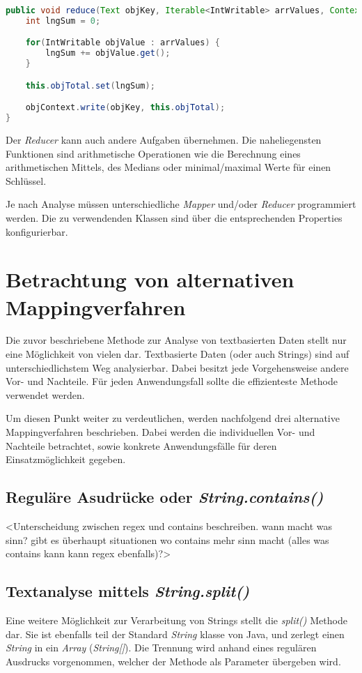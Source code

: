\begin{lstlisting}[language=Java,caption=Methode \textit{reduce()} der Klasse \textit{CountReducer},label=lst:MethodeReduce]
public void reduce(Text objKey, Iterable<IntWritable> arrValues, Context objContext) throws IOException, InterruptedException {
	int lngSum = 0;

	for(IntWritable objValue : arrValues) {
		lngSum += objValue.get();
	}

	this.objTotal.set(lngSum);

	objContext.write(objKey, this.objTotal);
}
\end{lstlisting}

Der \textit{Reducer} kann auch andere Aufgaben übernehmen. Die naheliegensten Funktionen sind arithmetische Operationen wie die Berechnung eines arithmetischen Mittels, des Medians oder minimal/maximal Werte für einen Schlüssel.

Je nach Analyse müssen unterschiedliche \textit{Mapper} und/oder \textit{Reducer} programmiert werden. Die zu verwendenden Klassen sind über die entsprechenden Properties konfigurierbar.

\section{Betrachtung von alternativen Mappingverfahren}
Die zuvor beschriebene Methode zur Analyse von textbasierten Daten stellt nur eine Möglichkeit von vielen dar. Textbasierte Daten (oder auch Strings) sind auf unterschiedlichstem Weg analysierbar. Dabei besitzt jede Vorgehensweise andere Vor- und Nachteile. Für jeden Anwendungsfall sollte die effizienteste Methode verwendet werden.

Um diesen Punkt weiter zu verdeutlichen, werden nachfolgend drei alternative Mappingverfahren beschrieben. Dabei werden die individuellen Vor- und Nachteile betrachtet, sowie konkrete Anwendungsfälle für deren Einsatzmöglichkeit gegeben. 

\subsection{Reguläre Asudrücke oder \textit{String.contains()}}\label{subsec:Contains}


<Unterscheidung zwischen regex und contains beschreiben. wann macht was sinn? gibt es überhaupt situationen wo contains mehr sinn macht (alles was contains kann kann regex ebenfalls)?>


\subsection{Textanalyse mittels \textit{String.split()}}
Eine weitere Möglichkeit zur Verarbeitung von Strings stellt die \textit{split()} Methode dar. Sie ist ebenfalls teil der Standard \textit{String} klasse von Java, und zerlegt einen \textit{String} in ein \textit{Array} (\textit{String[]}). Die Trennung wird anhand eines regulären Ausdrucks vorgenommen, welcher der Methode als Parameter übergeben wird.

